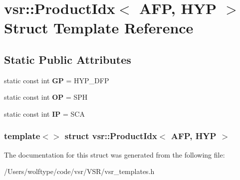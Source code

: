 \hypertarget{structvsr_1_1_product_idx_3_01_a_f_p_00_01_h_y_p_01_4}{\section{vsr\-:\-:Product\-Idx$<$ A\-F\-P, H\-Y\-P $>$ Struct Template Reference}
\label{structvsr_1_1_product_idx_3_01_a_f_p_00_01_h_y_p_01_4}
}
\subsection*{Static Public Attributes}
\begin{DoxyCompactItemize}
\item 
\hypertarget{structvsr_1_1_product_idx_3_01_a_f_p_00_01_h_y_p_01_4_a896410df2e8292b33c2ba2c1d001c61f}{static const int {\bfseries G\-P} = H\-Y\-P\-\_\-\-D\-F\-P}\label{structvsr_1_1_product_idx_3_01_a_f_p_00_01_h_y_p_01_4_a896410df2e8292b33c2ba2c1d001c61f}

\item 
\hypertarget{structvsr_1_1_product_idx_3_01_a_f_p_00_01_h_y_p_01_4_aba4799df25a63968a1ce04bb1fb12407}{static const int {\bfseries O\-P} = S\-P\-H}\label{structvsr_1_1_product_idx_3_01_a_f_p_00_01_h_y_p_01_4_aba4799df25a63968a1ce04bb1fb12407}

\item 
\hypertarget{structvsr_1_1_product_idx_3_01_a_f_p_00_01_h_y_p_01_4_ac38cd2ff146f47de8860d9842e7b46e2}{static const int {\bfseries I\-P} = S\-C\-A}\label{structvsr_1_1_product_idx_3_01_a_f_p_00_01_h_y_p_01_4_ac38cd2ff146f47de8860d9842e7b46e2}

\end{DoxyCompactItemize}
\subsubsection*{template$<$$>$ struct vsr\-::\-Product\-Idx$<$ A\-F\-P, H\-Y\-P $>$}



The documentation for this struct was generated from the following file\-:\begin{DoxyCompactItemize}
\item 
/\-Users/wolftype/code/vsr/\-V\-S\-R/vsr\-\_\-templates.\-h\end{DoxyCompactItemize}
